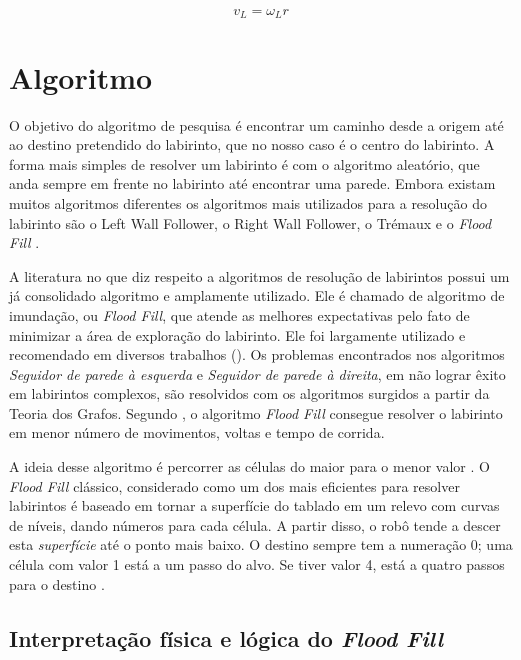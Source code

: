 \begin{equation}
	\label{eq:veloc_vl}
	v_L = \omega_Lr
\end{equation}




\section{Algoritmo}

\begin{citacao}
O objetivo do algoritmo de pesquisa é encontrar um caminho desde a origem até ao destino pretendido do labirinto, que no nosso caso é o centro do labirinto. A forma mais simples de resolver um labirinto é com o algoritmo aleatório, que anda sempre em frente no labirinto até encontrar uma parede. Embora existam muitos algoritmos diferentes os algoritmos mais utilizados para a resolução do labirinto são o Left Wall Follower, o Right Wall Follower, o Trémaux e o \emph{Flood Fill} .
\end{citacao}

A literatura no que diz respeito a algoritmos de resolução de labirintos possui um já consolidado algoritmo e amplamente utilizado. Ele é chamado de algoritmo de imundação, ou \emph{Flood Fill}, que atende as melhores expectativas pelo fato de minimizar a área de exploração do labirinto. Ele foi largamente utilizado e recomendado em diversos trabalhos (). Os problemas encontrados nos algoritmos \emph{Seguidor de parede à esquerda} e \emph{Seguidor de parede à direita}, em não lograr êxito em labirintos complexos, são resolvidos com os algoritmos surgidos a partir da Teoria dos Grafos. Segundo , o algoritmo \emph{Flood Fill} consegue resolver o labirinto em menor número de movimentos, voltas e tempo de corrida. 

A ideia desse algoritmo é percorrer as células do maior para o menor valor \cite{remendo3}. O \textit{Flood Fill} clássico, considerado como um dos mais eficientes para resolver labirintos é baseado em tornar a superfície do tablado em um relevo com curvas de níveis, dando números para cada célula. A partir disso, o robô tende a descer esta \emph{superfície} até o ponto mais baixo. O destino sempre tem a numeração 0; uma célula com valor 1 está a um passo do alvo. Se tiver valor 4, está a quatro passos para o destino \cite{utad}.

\subsection{Interpretação física e lógica do \emph{Flood Fill}}

